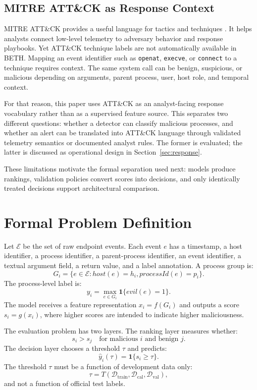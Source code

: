 \documentclass[10pt,journal,compsoc]{IEEEtran}
\begin{document}
\subsection{MITRE ATT\&CK as Response Context}

MITRE ATT\&CK provides a useful language for tactics and techniques \cite{mitre2023,strom2018}. It helps analysts connect low-level telemetry to adversary behavior and response playbooks. Yet ATT\&CK technique labels are not automatically available in BETH. Mapping an event identifier such as \texttt{openat}, \texttt{execve}, or \texttt{connect} to a technique requires context. The same system call can be benign, suspicious, or malicious depending on arguments, parent process, user, host role, and temporal context.

For that reason, this paper uses ATT\&CK as an analyst-facing response vocabulary rather than as a supervised feature source. This separates two different questions: whether a detector can classify malicious processes, and whether an alert can be translated into ATT\&CK language through validated telemetry semantics or documented analyst rules. The former is evaluated; the latter is discussed as operational design in Section~\ref{sec:response}.

These limitations motivate the formal separation used next: models produce rankings, validation policies convert scores into decisions, and only identically treated decisions support architectural comparison.

\section{Formal Problem Definition}
\label{sec:formal}

Let $\mathcal{E}$ be the set of raw endpoint events. Each event $e$ has a timestamp, a host identifier, a process identifier, a parent-process identifier, an event identifier, a textual argument field, a return value, and a label annotation. A process group is:
\[
G_i = \{e \in \mathcal{E}: host(e)=h_i, processId(e)=p_i\}.
\]
The process-level label is:
\[
y_i = \max_{e\in G_i}\mathbf{1}\{evil(e)=1\}.
\]
The model receives a feature representation $x_i=f(G_i)$ and outputs a score $s_i=g(x_i)$, where higher scores are intended to indicate higher maliciousness.

The evaluation problem has two layers. The ranking layer measures whether:
\[
s_i > s_j \quad \text{for malicious } i \text{ and benign } j.
\]
The decision layer chooses a threshold $\tau$ and predicts:
\[
\hat{y}_i(\tau)=\mathbf{1}\{s_i \geq \tau\}.
\]
The threshold $\tau$ must be a function of development data only:
\[
\tau = T(\mathcal{D}_{\text{train}},\mathcal{D}_{\text{cal}},\mathcal{D}_{\text{val}}),
\]
and not a function of official test labels.
\end{document}
